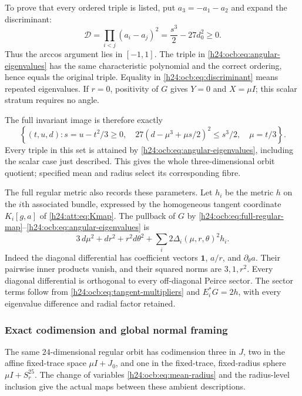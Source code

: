 To prove that every ordered triple is listed, put $a_3=-a_1-a_2$
and expand the discriminant:
\begin{equation}
 \mathcal D=\prod_{i<j}(a_i-a_j)^2
            =\frac{s^3}{2}-27d_0^2\ge0.
 \label{h24:ocb:eq:discriminant}\tag{OCB17}
\end{equation}
Thus the arccos argument lies in $[-1,1]$. The triple in
\eqref{h24:ocb:eq:angular-eigenvalues} has the same characteristic
polynomial and the correct ordering, hence equals the original
triple. Equality in \eqref{h24:ocb:eq:discriminant} means repeated
eigenvalues. If $r=0$, positivity of $G$ gives $Y=0$ and $X=\mu I$;
this scalar stratum requires no angle.

The full invariant image is therefore exactly
\begin{equation}
 \left\{(t,u,d):s=u-t^2/3\ge0,\quad
 27(d-\mu^3+\mu s/2)^2\le s^3/2,\quad\mu=t/3\right\}.
 \label{h24:ocb:eq:invariant-image}\tag{OCB18}
\end{equation}
Every triple in this set is attained by
\eqref{h24:ocb:eq:angular-eigenvalues}, including the scalar case just
described. This gives the whole three-dimensional orbit quotient;
specified mean and radius select its corresponding fibre.

The full regular metric also records these parameters. Let $h_i$ be
the metric $h$ on the $i$th associated bundle, expressed by the
homogeneous tangent coordinate $K_i[g,a]$ of \eqref{h24:att:eq:Kmap}.
The pullback of $G$ by
\eqref{h24:ocb:eq:full-regular-map}--\eqref{h24:ocb:eq:angular-eigenvalues} is
\begin{equation}
 3\,d\mu^2+dr^2+r^2d\theta^2
             +\sum_i2\Delta_i(\mu,r,\theta)^2h_i.
 \label{h24:ocb:eq:full-metric}\tag{OCB19}
\end{equation}
Indeed the diagonal differential has coefficient vectors
$\mathbf1$, $a/r$, and $\partial_\theta a$. Their pairwise inner
products vanish, and their squared norms are $3,1,r^2$. Every
diagonal differential is orthogonal to every off-diagonal Peirce
sector. The sector terms follow from
\eqref{h24:ocb:eq:tangent-multipliers} and $E_i^*G=2h$, with every
eigenvalue difference and radial factor retained.

\subsubsection{Exact codimension and global normal framing}
\label{h24:ocb:sec:normal-framing}

The same $24$-dimensional regular orbit has codimension three in $J$,
two in the affine fixed-trace space $\mu I+J_0$, and one in the
fixed-trace, fixed-radius sphere $\mu I+S_r^{25}$. The change of
variables \eqref{h24:ocb:eq:mean-radius} and the radius-level inclusion
give the actual maps between these ambient descriptions.

